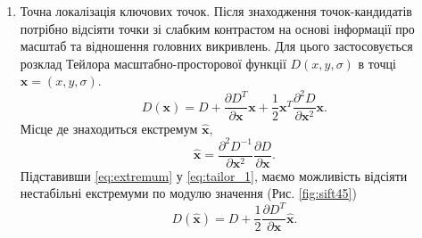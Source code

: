 \begin{enumerate}
    \item Точна локалізація ключових точок. Після знаходження точок-кандидатів потрібно 
          відсіяти точки зі слабким контрастом на основі
          інформації про масштаб та відношення головних викривлень. Для цього застосовується розклад
          Тейлора масштабно-просторової функції $D(x,y,\sigma)$ в точці $\boldsymbol{x} = (x,y,\sigma)$.
          \begin{equation}
              D(\boldsymbol{x}) = D + \frac{\partial D^T }{\partial \boldsymbol{x} }\boldsymbol{x} +
              \frac{1}{2}\boldsymbol{x}^T\frac{\partial^2 D}{\partial \boldsymbol{x}^2}\boldsymbol{x}.
              \label{eq:tailor_1}
          \end{equation}
          Місце де знаходиться екстремум $\widehat{\boldsymbol{x}}$,
          \begin{equation}
              \widehat{\boldsymbol{x}} = \frac{\partial^2 D^{-1} }{\partial
                  \boldsymbol{x}^2}\frac{\partial D }{\partial \boldsymbol{x}}.
              \label{eq:extremum}
          \end{equation}
          Підставивши \ref{eq:extremum} у \ref{eq:tailor_1}, маємо можливість відсіяти нестабільні
          екстремуми по модулю значення (Рис. \ref{fig:sift45})
          \begin{equation*}
              D(\widehat{\boldsymbol{x}}) = D + \frac{1}{2}\frac{\partial D^{T} }{\partial \boldsymbol{x}}\widehat{\boldsymbol{x}}.
          \end{equation*}


\end{enumerate}
